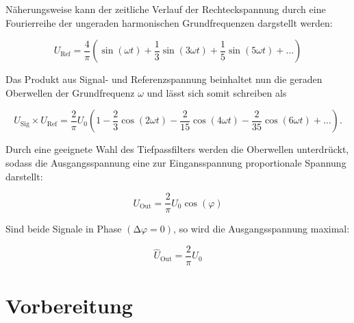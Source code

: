 \noindent Näherungsweise kann der zeitliche Verlauf der Rechteckspannung durch eine Fourierreihe der ungeraden harmonischen
Grundfrequenzen dargstellt werden:

\begin{equation*}
    U_\text{Ref} = \frac{4}{\pi}\left(\sin(\omega t) + \frac{1}{3}\sin(3\omega t) + \frac{1}{5}\sin(5\omega t) + \dotsc\right)
\end{equation*}

\noindent Das Produkt aus Signal- und Referenzspannung beinhaltet nun die geraden Oberwellen der Grundfrequenz $\omega$ und lässt
sich somit schreiben als

\begin{equation*}
    U_\text{Sig} \times U_\text{Ref} = \frac{2}{\pi}U_0\left(1 - \frac{2}{3}\cos(2\omega t) - \frac{2}{15}\cos(4\omega t) - \frac{2}{35}\cos(6\omega t) + \dotsc\right).
\end{equation*}

\noindent Durch eine geeignete Wahl des Tiefpassfilters werden die Oberwellen unterdrückt, sodass die Ausgangsspannung eine zur Eingansspannung
proportionale Spannung darstellt:

\begin{equation}
    U_\text{Out} = \frac{2}{\pi}U_0\cos(\varphi)
    \label{eqn:U_out}
\end{equation}

\noindent Sind beide Signale in Phase $\left(\increment \varphi = 0\right)$, so wird die Ausgangsspannung maximal:

\begin{equation*}
    \hat{U}_\text{Out} = \frac{2}{\pi}U_0
\end{equation*}

\section{Vorbereitung}

%